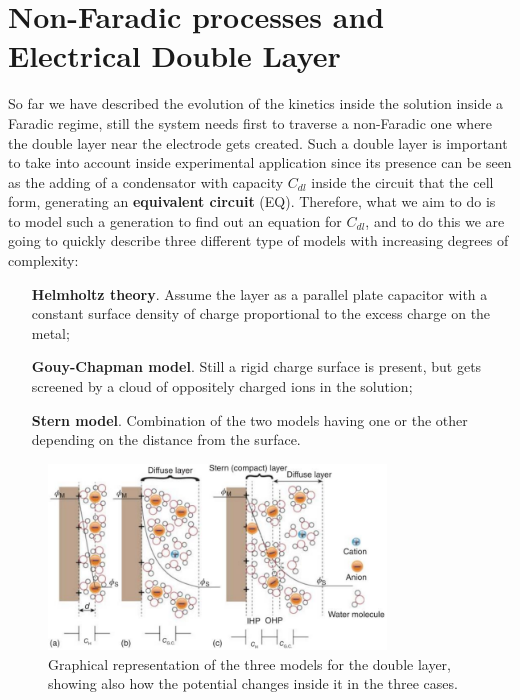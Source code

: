\section{Non-Faradic processes and Electrical Double Layer}

So far we have described the evolution of the kinetics inside the solution inside a Faradic regime, still the system needs first to traverse a non-Faradic one where the double layer near the electrode gets created. Such a double layer is important to take into account inside experimental application since its presence can be seen as the adding of a condensator with capacity $C_{dl}$ inside the circuit that the cell form, generating an \textbf{equivalent circuit} (EQ). Therefore, what we aim to do is to model such a generation to find out an equation for $C_{dl}$, and to do this we are going to quickly describe three different type of models with increasing degrees of complexity:
\begin{itemize}[align=left, leftmargin=*]
    \item[\textbf{Helmholtz theory}.] Assume the layer as a parallel plate capacitor with a constant surface density of charge proportional to the excess charge on the metal;
    \item[\textbf{Gouy-Chapman model}.] Still a rigid charge surface is present, but gets screened by a cloud of oppositely charged ions in the solution;
    \item[\textbf{Stern model}.] Combination of the two models having one or the other depending on the distance from the surface.
\end{itemize}
\begin{figure}[t]
    \centering
    \includegraphics[width=0.8\textwidth]{Immagini/DoubleLayer.png}
    \caption{
        Graphical representation of the three models for the double layer, showing also how the potential changes inside it in the three cases.
    }
    \label{fig:DoubleLayer}
\end{figure}

